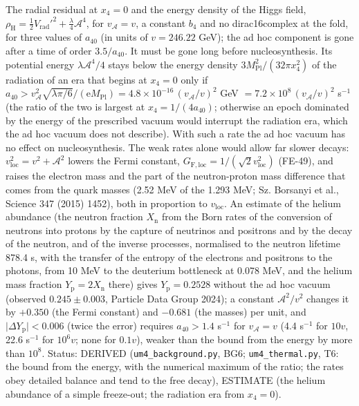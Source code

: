 \documentclass[
  10pt,
]{article}
\begin{document}
The radial residual at \(x_4 = 0\) and the energy density of the Higgs
field,
\(\rho_{\mathrm{H}} = \frac12V_{\mathrm{rad}}'^2 + \frac{\lambda}{4}\mathcal{A}^4\),
for \(v_{\mathcal{A}} = v\), a constant \(b_4\) and no dirac16complex at
the fold, for three values of \(a_{40}\) (in units of \(v = 246.22\)
GeV); the ad hoc component is gone after a time of order \(3.5/a_{40}\).
It must be gone long before nucleosynthesis. Its potential energy
\(\lambda\mathcal{A}^4/4\) stays below the energy density
\(3M_{\mathrm{Pl}}^2/(32\pi x_4^2)\) of the radiation of an era that
begins at \(x_4 = 0\) only if
\(a_{40} > v_{\mathcal{A}}^2\sqrt{\lambda\pi/6}/(\mathrm{e}M_{\mathrm{Pl}}) = 4.8\times10^{-16}\,(v_{\mathcal{A}}/v)^2\)
GeV \(= 7.2\times10^8\,(v_{\mathcal{A}}/v)^2\) s\(^{-1}\) (the ratio of
the two is largest at \(x_4 = 1/(4a_{40})\); otherwise an epoch
dominated by the energy of the prescribed vacuum would interrupt the
radiation era, which the ad hoc vacuum does not describe). With such a
rate the ad hoc vacuum has no effect on nucleosynthesis. The weak rates
alone would allow far slower decays:
\(v_{\mathrm{loc}}^2 = v^2 + \mathcal{A}^2\) lowers the Fermi constant,
\(G_{\mathrm{F,loc}} = 1/(\sqrt2 v_{\mathrm{loc}}^2)\) (FE-49), and
raises the electron mass and the part of the neutron-proton mass
difference that comes from the quark masses (2.52 MeV of the 1.293 MeV;
Sz. Borsanyi et al., Science 347 (2015) 1452), both in proportion to
\(v_{\mathrm{loc}}\). An estimate of the helium abundance (the neutron
fraction \(X_{\mathrm{n}}\) from the Born rates of the conversion of
neutrons into protons by the capture of neutrinos and positrons and by
the decay of the neutron, and of the inverse processes, normalised to
the neutron lifetime 878.4 s, with the transfer of the entropy of the
electrons and positrons to the photons, from 10 MeV to the deuterium
bottleneck at 0.078 MeV, and the helium mass fraction
\(Y_{\mathrm{p}} = 2X_{\mathrm{n}}\) there) gives
\(Y_{\mathrm{p}} = 0.2528\) without the ad hoc vacuum (observed
\(0.245 \pm 0.003\), Particle Data Group 2024); a constant
\(\mathcal{A}^2/v^2\) changes it by \(+0.350\) (the Fermi constant) and
\(-0.681\) (the masses) per unit, and
\(\lvert\Delta Y_{\mathrm{p}}\rvert < 0.006\) (twice the error) requires
\(a_{40} > 1.4\) s\(^{-1}\) for \(v_{\mathcal{A}} = v\) (4.4 s\(^{-1}\)
for \(10v\), 22.6 s\(^{-1}\) for \(10^6v\); none for \(0.1v\)), weaker
than the bound from the energy by more than \(10^8\). Status: DERIVED
(\texttt{um4\_background.py}, BG6; \texttt{um4\_thermal.py}, T6: the
bound from the energy, with the numerical maximum of the ratio; the
rates obey detailed balance and tend to the free decay), ESTIMATE (the
helium abundance of a simple freeze-out; the radiation era from
\(x_4 = 0\)).
\end{document}

